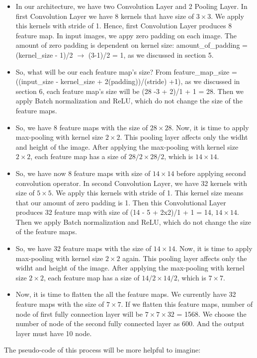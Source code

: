 \documentclass[11pt]{article}
\begin{document}
\begin{itemize}
\item In our architecture, we have two Convolution Layer and 2 Pooling Layer. In first Convolution Layer we have 8 kernels that have size of $3 \times 3$. We apply this kernels with stride of 1. Hence, first Convolution Layer produces 8 feature map. In input images, we appy zero padding on each image. The amount of zero padding is dependent on kernel size: amount\_of\_padding = (kernel\_size - 1)/2 $\rightarrow$ (3-1)/2 = 1, as we discussed in section 5.\\
\item So, what will be our each feature map's size? From feature\_map\_size =  ((input\_size - kernel\_size + 2(padding))/(stride) +1), as we discussed in section 6, each feature map's size will be (28 -3 + 2)/1 + 1 = 28. Then we apply Batch normalization and ReLU, which do not change the size of the feature maps.\\
\item So, we have 8 feature maps with the size of $28\times28$. Now, it is time to apply max-pooling with kernel size $2\times2$. This pooling layer affects only the widht and height of the image. After applying the max-pooling with kernel size $2\times2$, each feature map has a size of $28/2 \times 28/2$, which is $14 \times 14$.\\
\item So, we have now 8 feature maps with size of $14 \times 14$ before applying second convolution operator. In second Convolution Layer, we have 32 kernels with size of $5\times5$. We apply this kernels with stride of 1. This kernel size means that our amount of zero padding is 1. Then this Convolutional Layer produces 32 feature map with size of (14 - 5 + 2x2)/1 + 1 = 14, $14 \times 14$. Then we apply Batch normalization and ReLU, which do not change the size of the feature maps.\\
\item So, we have 32 feature maps with the size of $14\times14$. Now, it is time to apply max-pooling with kernel size $2\times2$ again. This pooling layer affects only the widht and height of the image. After applying the max-pooling with kernel size $2\times2$, each feature map has a size of $14/2 \times 14/2$, which is $7 \times 7$.
\item Now, it is time to flatten the all the feature maps. We currently have 32 feature maps with the size of $7 \times 7$. If we flatten this feature maps, number of node of first fully connection layer will be $7 \times 7 \times 32$ = 1568. We choose the number of node of the second fully connected layer as 600. And the output layer must have 10 node.  
\end{itemize}
The pseudo-code of this process will be more helpful to imagine:
\\
\end{document}
